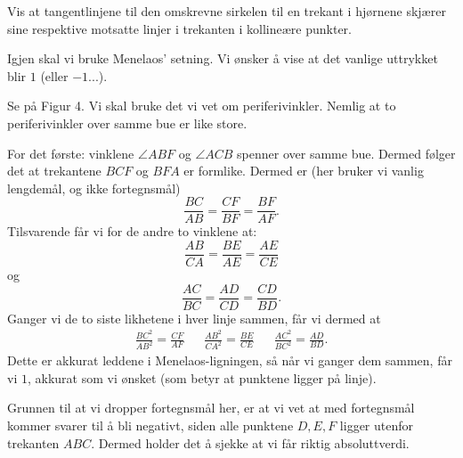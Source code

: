 \documentclass[11pt, norsk]{article}
\begin{document}
\begin{oppg}
Vis at tangentlinjene til den omskrevne sirkelen til en trekant i hjørnene skjærer sine respektive motsatte linjer i trekanten i kollineære punkter.
\end{oppg}


\begin{losn}
 Igjen skal vi bruke Menelaos' setning. Vi ønsker å vise at det vanlige uttrykket blir $1$ (eller $-1$...).

Se på Figur 4. Vi skal bruke det vi vet om periferivinkler. Nemlig at to periferivinkler over samme bue er like store.

For det første: vinklene $\angle ABF$ og $\angle ACB$ spenner over samme bue. Dermed følger det at trekantene $BCF$ og $BFA$ er formlike. Dermed er (her bruker vi vanlig lengdemål, og ikke fortegnsmål)
$$
\frac{BC}{AB}=\frac{CF}{BF} = \frac{BF}{AF}.
$$
Tilsvarende får vi for de andre to vinklene at:
$$
\frac{AB}{CA} = \frac{BE}{AE} = \frac{AE}{CE}
$$
og 
$$
\frac{AC}{BC} = \frac{AD}{CD} = \frac{CD}{BD}.
$$
Ganger vi de to siste likhetene i hver linje sammen, får vi dermed at
\begin{align*}
\frac{BC^2}{AB^2} = \frac{CF}{AF} && \frac{AB^2}{CA^2} = \frac{BE}{CE} &&  \frac{AC^2}{BC^2} = \frac{AD}{BD}.
\end{align*}
Dette er akkurat leddene i Menelaos-ligningen, så når vi ganger dem sammen, får vi $1$, akkurat som vi ønsket (som betyr at punktene ligger på linje).

Grunnen til at vi dropper fortegnsmål her, er at vi vet at med fortegnsmål kommer svarer til å bli negativt, siden alle punktene $D,E,F$ ligger utenfor trekanten $ABC$. Dermed holder det å sjekke at vi får riktig absoluttverdi.



\end{losn}
\end{document}
